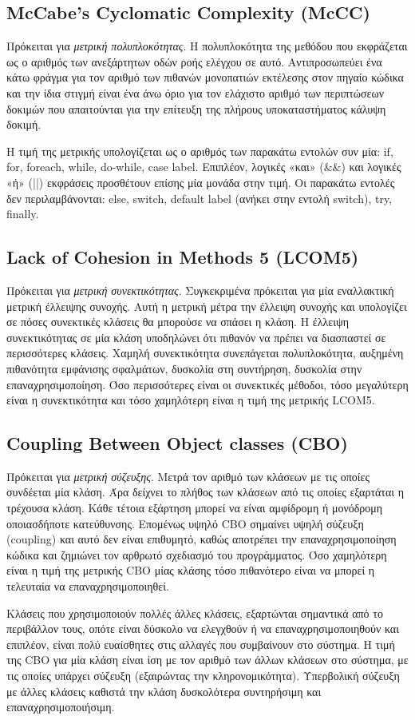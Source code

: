 \subsection{McCabe's Cyclomatic Complexity (McCC)}

Πρόκειται για \emph{μετρική πολυπλοκότητας}. Η πολυπλοκότητα της μεθόδου
που εκφράζεται ως ο αριθμός των ανεξάρτητων οδών ροής ελέγχου σε αυτό.
Αντιπροσωπεύει ένα κάτω φράγμα για τον αριθμό των πιθανών μονοπατιών
εκτέλεσης στον πηγαίο κώδικα και την ίδια στιγμή είναι ένα άνω όριο για
τον ελάχιστο αριθμό των περιπτώσεων δοκιμών που απαιτούνται για την
επίτευξη της πλήρους υποκαταστήματος κάλυψη δοκιμή.

Η τιμή της μετρικής υπολογίζεται ως ο αριθμός των παρακάτω εντολών συν
μία: if, for, foreach, while, do-while, case label. Επιπλέον, λογικές «και»
(\&\&) και λογικές «ή» (||) εκφράσεις προσθέτουν επίσης μία μονάδα στην τιμή. Οι
παρακάτω εντολές δεν περιλαμβάνονται: else, switch, default label
(ανήκει στην εντολή switch), try, finally.


\subsection{Lack of Cohesion in Methods 5  (LCOM5)}

Πρόκειται για \emph{μετρική συνεκτικότητας}. Συγκεκριμένα πρόκειται για
μία εναλλακτική μετρική έλλειψης συνοχής. Αυτή η μετρική μέτρα την
έλλειψη συνοχής και υπολογίζει σε πόσες συνεκτικές κλάσεις θα μπορούσε
να σπάσει η κλάση. Η έλλειψη συνεκτικότητας σε μία κλάση υποδηλώνει ότι
πιθανόν να πρέπει να διασπαστεί σε περισσότερες κλάσεις. Χαμηλή
συνεκτικότητα συνεπάγεται πολυπλοκότητα, αυξημένη πιθανότητα εμφάνισης
σφαλμάτων, δυσκολία στη συντήρηση, δυσκολία στην επαναχρησιμοποίηση. Όσο
περισσότερες είναι οι συνεκτικές μέθοδοι, τόσο μεγαλύτερη είναι η
συνεκτικότητα και τόσο χαμηλότερη είναι η τιμή της μετρικής LCOM5.

\subsection{Coupling Between Object classes (CBO)}

Πρόκειται για \emph{μετρική σύζευξης}. Μετρά τον αριθμό των κλάσεων με
τις οποίες συνδέεται μία κλάση. Άρα δείχνει το πλήθος των κλάσεων από
τις οποίες εξαρτάται η τρέχουσα κλάση. Κάθε τέτοια εξάρτηση μπορεί να
είναι αμφίδρομη ή μονόδρομη οποιασδήποτε κατεύθυνσης. Επομένως υψηλό CBO
σημαίνει υψηλή σύζευξη (coupling) και αυτό δεν είναι επιθυμητό, καθώς
αποτρέπει την επαναχρησιμοποίηση κώδικα και ζημιώνει τον αρθρωτό
σχεδιασμό του προγράμματος. Όσο χαμηλότερη είναι η τιμή της μετρικής CBO
μίας κλάσης τόσο πιθανότερο είναι να μπορεί η τελευταία να
επαναχρησιμοποιηθεί. 

Κλάσεις που χρησιμοποιούν πολλές άλλες κλάσεις, εξαρτώνται σημαντικά από
το περιβάλλον τους, οπότε είναι δύσκολο να ελεγχθούν ή να
επαναχρησιμοποιηθούν και επιπλέον, είναι πολύ ευαίσθητες στις αλλαγές
που συμβαίνουν στο σύστημα. Η τιμή της CBO για μία κλάση είναι ίση με
τον αριθμό των άλλων κλάσεων στο σύστημα, με τις οποίες υπάρχει σύζευξη
(εξαιρώντας την κληρονομικότητα). Υπερβολική σύζευξη με άλλες κλάσεις
καθιστά την κλάση δυσκολότερα συντηρήσιμη και επαναχρησιμοποιήσιμη.

